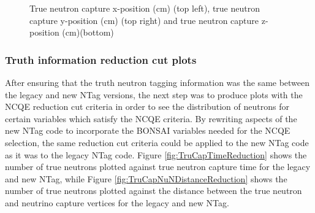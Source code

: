 \begin{figure}
\begin{minipage}{0.5\linewidth}
    \end{minipage}\par\medskip
    \centering
    
    \caption{True neutron capture x-position (cm) (top left), true neutron capture y-position (cm) (top right) and true neutron capture z-position (cm)(bottom) }
    \label{fig:TrueNCapPos}
\end{figure}


    
\subsubsection{Truth information reduction cut plots}

After ensuring that the truth neutron tagging information was the same between the legacy and new NTag versions, the next step was to produce plots with the NCQE reduction cut criteria in order to see the distribution of neutrons for certain variables which satisfy the NCQE criteria. By rewriting aspects of the new NTag code to incorporate the BONSAI variables needed for the NCQE selection, the same reduction cut criteria could be applied to the new NTag code as it was to the legacy NTag code. Figure \ref{fig:TruCapTimeReduction} shows the number of true neutrons plotted against true neutron capture time for the legacy and new NTag, while Figure \ref{fig:TruCapNuNDistanceReduction} shows the number of true neutrons plotted against the distance between the true neutron and neutrino capture vertices for the legacy and new NTag.

